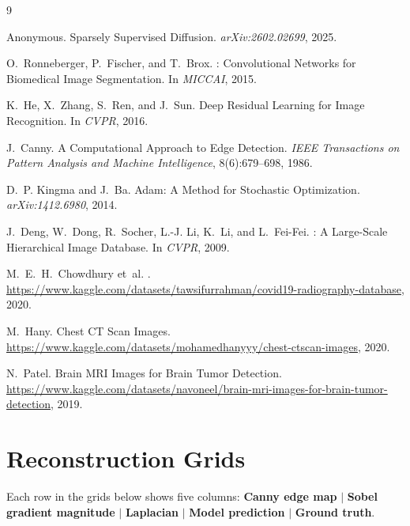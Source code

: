 \documentclass[10pt,twocolumn]{article}
\begin{document}

\begin{thebibliography}{9}

Anonymous.
\newblock Sparsely Supervised Diffusion.
\newblock \textit{arXiv:2602.02699}, 2025.

O.~Ronneberger, P.~Fischer, and T.~Brox.
: Convolutional Networks for Biomedical Image Segmentation.
\newblock In \textit{MICCAI}, 2015.

K.~He, X.~Zhang, S.~Ren, and J.~Sun.
\newblock Deep Residual Learning for Image Recognition.
\newblock In \textit{CVPR}, 2016.

J.~Canny.
\newblock A Computational Approach to Edge Detection.
\newblock \textit{IEEE Transactions on Pattern Analysis and Machine Intelligence},
  8(6):679--698, 1986.

D.~P. Kingma and J.~Ba.
\newblock Adam: A Method for Stochastic Optimization.
\newblock \textit{arXiv:1412.6980}, 2014.

J.~Deng, W.~Dong, R.~Socher, L.-J. Li, K.~Li, and L.~Fei-Fei.
: A Large-Scale Hierarchical Image Database.
\newblock In \textit{CVPR}, 2009.

M.~E.~H.~Chowdhury et~al.
.
\newblock \url{https://www.kaggle.com/datasets/tawsifurrahman/covid19-radiography-database}, 2020.

M.~Hany.
\newblock Chest {CT} Scan Images.
\newblock \url{https://www.kaggle.com/datasets/mohamedhanyyy/chest-ctscan-images}, 2020.

N.~Patel.
\newblock Brain {MRI} Images for Brain Tumor Detection.
\newblock \url{https://www.kaggle.com/datasets/navoneel/brain-mri-images-for-brain-tumor-detection}, 2019.

\end{thebibliography}

\appendix
\onecolumn

\section{Reconstruction Grids}
\label{app:grids}

Each row in the grids below shows five columns:
\textbf{Canny edge map} $|$ \textbf{Sobel gradient magnitude} $|$
\textbf{Laplacian} $|$ \textbf{Model prediction} $|$ \textbf{Ground truth}.
\end{document}
